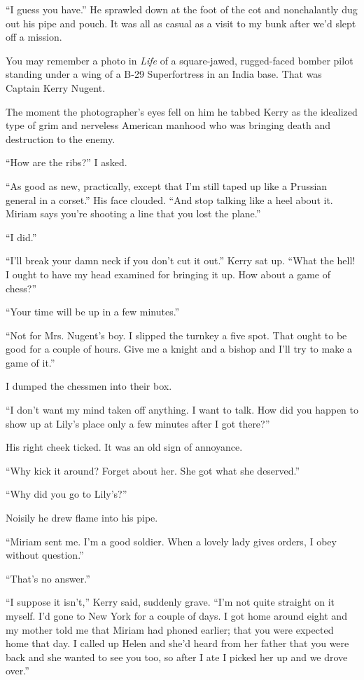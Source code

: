 \documentclass{novel}
\begin{document}
“I guess you have.” He sprawled down at the foot of the cot and nonchalantly dug out his pipe and pouch. It was all as casual as a visit to my bunk after we’d slept off a mission.

You may remember a photo in \textit{Life} of a square-jawed, rugged-faced bomber pilot standing under a wing of a B-29 Superfortress in an India base. That was Captain Kerry Nugent. 

The moment the photographer’s eyes fell on him he tabbed Kerry as the idealized type of grim and nerveless American manhood who was bringing death and destruction to the enemy.

“How are the ribs?” I asked.

“As good as new, practically, except that I’m still taped up like a Prussian general in a corset.” His face clouded. “And stop talking like a heel about it. Miriam says you’re shooting a line that you lost the plane.”

“I did.”

“I’ll break your damn neck if you don’t cut it out.” Kerry sat up. “What the hell! I ought to have my head examined for bringing it up. How about a game of chess?”

“Your time will be up in a few minutes.”

“Not for Mrs. Nugent’s boy. I slipped the turnkey a five spot. That ought to be good for a couple of hours. Give me a knight and a bishop and I’ll try to make a game of it.”

I dumped the chessmen into their box.

“I don’t want my mind taken off anything. I want to talk. How did you happen to show up at Lily’s place only a few minutes after I got there?”

His right cheek ticked. It was an old sign of annoyance.

“Why kick it around? Forget about her. She got what she deserved.”

“Why did you go to Lily’s?”

Noisily he drew flame into his pipe.

“Miriam sent me. I’m a good soldier. When a lovely lady gives orders, I obey without question.”

“That’s no answer.”

“I suppose it isn’t,” Kerry said, suddenly grave. “I’m not quite straight on it myself. I’d gone to New York for a couple of days. I got home around eight and my mother told me that Miriam had phoned earlier; that you were expected home that day. I called up Helen and she’d heard from her father that you were back and she wanted to see you too, so after I ate I picked her up and we drove over.”
\end{document}
